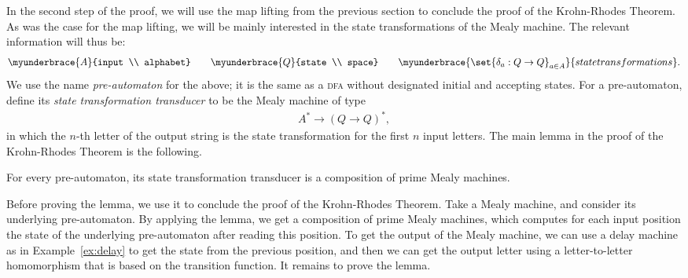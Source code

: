 In the second step of the proof, we will use the map lifting from the previous section to conclude the proof of the Krohn-Rhodes Theorem. As was the case for the map lifting, we will be mainly interested in the state transformations of the Mealy machine. The relevant information will thus be: 
\begin{align}\label{eq:pre-automaton}
\myunderbrace{A}{input \\ alphabet} \qquad 
\myunderbrace{Q}{state \\ space} \qquad 
\myunderbrace{\set{\delta_a : Q \to Q}_{a \in A}}{state transformations}.
\end{align}
We use the name \emph{pre-automaton} for the above; it is the same as a \textsc{dfa} without designated initial and accepting states. For a pre-automaton, define its \emph{state transformation transducer} to be the Mealy machine of type  
\begin{align*}
A^* \to (Q \to Q)^*,
\end{align*}
in which the  $n$-th letter of the output string is the state transformation for the first $n$ input letters. The main lemma in the proof of the Krohn-Rhodes Theorem is the following. 

\begin{lemma}\label{lem:Mealy-map-lifting}
    For every pre-automaton, its state transformation transducer  is a composition of prime Mealy machines.
\end{lemma}

Before proving the lemma, we use it to conclude the proof of the Krohn-Rhodes Theorem. Take a Mealy machine, and consider its  underlying pre-automaton.  By applying the lemma, we get a composition of prime Mealy machines, which computes for each input position the state of the underlying pre-automaton after reading this position. To get the output of the Mealy machine, we can use a delay machine as in Example~\ref{ex:delay} to get the state from the previous position, and then we can get the output letter using a letter-to-letter homomorphism that is based on the transition function. It remains to prove the lemma.

